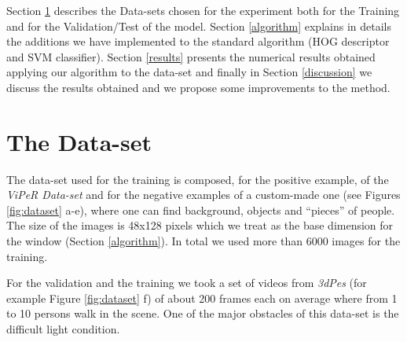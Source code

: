 \documentclass[a4paper, 10pt, onecolumn]{article} %
\begin{document}
Section \ref{dataset} describes the Data-sets chosen for the experiment both for the Training and for the Validation/Test of the model. Section \ref{algorithm} explains in details the additions we have implemented to the standard algorithm (HOG descriptor and SVM classifier). Section \ref{results} presents the numerical results obtained applying our algorithm to the data-set and finally in Section \ref{discussion} we discuss the results obtained and we propose some improvements to the method.


\section{The Data-set}\label{dataset}
The data-set used for the training is composed, for the positive example, of the \emph{ViPeR Data-set} and for the negative examples of a custom-made one (see Figures \ref{fig:dataset} a-e), where one can find background, objects and ``pieces'' of people. 
The size of the images is 48x128 pixels which we treat as the base dimension for the window (Section \ref{algorithm}). In total we used more than 6000 images for the training.

For the validation and the training we took a set of videos from \emph{3dPes} (for example Figure \ref{fig:dataset} f) of about 200 frames each on average where from 1 to 10 persons walk in the scene. One of the major obstacles of this data-set is the difficult light condition.
\end{document}
